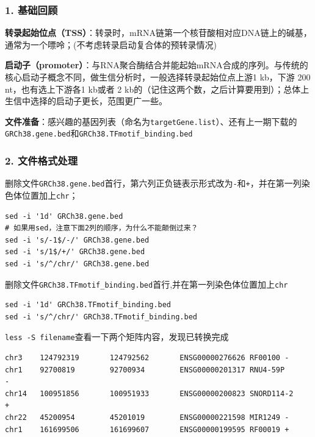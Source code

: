 \documentclass[]{article}
\numberwithin{figure}{section}
\numberwithin{table}{section}
\begin{document}
\hypertarget{biomart_motif_5}{%
\subsubsection{1. 基础回顾}\label{biomart_motif_5}}

\textbf{转录起始位点（TSS）}：转录时，mRNA链第一个核苷酸相对应DNA链上的碱基，通常为一个嘌呤；(不考虑转录启动复合体的预转录情况)

\textbf{启动子（promoter）}：与RNA聚合酶结合并能起始mRNA合成的序列。与传统的核心启动子概念不同，做生信分析时，一般选择转录起始位点上游1 kb，下游 200 nt，也有选上下游各1 kb或者 2 kb的（记住这两个数，之后计算要用到）；总体上生信中选择的启动子更长，范围更广一些。

\textbf{文件准备}：感兴趣的基因列表（命名为\texttt{targetGene.list}）、还有上一期下载的\texttt{GRCh38.gene.bed}和\texttt{GRCh38.TFmotif\_binding.bed}

\hypertarget{biomart_motif_6}{%
\subsubsection{2. 文件格式处理}\label{biomart_motif_6}}

删除文件\texttt{GRCh38.gene.bed}首行，第六列正负链表示形式改为\texttt{-}和\texttt{+}，并在第一列染色体位置加上\texttt{chr}；

\begin{verbatim}
sed -i '1d' GRCh38.gene.bed 
# 如果用sed，注意下面2列的顺序，为什么不能颠倒过来？
sed -i 's/-1$/-/' GRCh38.gene.bed
sed -i 's/1$/+/' GRCh38.gene.bed 
sed -i 's/^/chr/' GRCh38.gene.bed
\end{verbatim}

删除文件\texttt{GRCh38.TFmotif\_binding.bed}首行,并在第一列染色体位置加上\texttt{chr}

\begin{verbatim}
sed -i '1d' GRCh38.TFmotif_binding.bed
sed -i 's/^/chr/' GRCh38.TFmotif_binding.bed
\end{verbatim}

\texttt{less\ -S\ filename}查看一下两个矩阵内容，发现已转换完成

\begin{verbatim}
chr3    124792319       124792562       ENSG00000276626 RF00100 -
chr1    92700819        92700934        ENSG00000201317 RNU4-59P        -
chr14   100951856       100951933       ENSG00000200823 SNORD114-2      +
chr22   45200954        45201019        ENSG00000221598 MIR1249 -
chr1    161699506       161699607       ENSG00000199595 RF00019 +
\end{verbatim}
\end{document}
